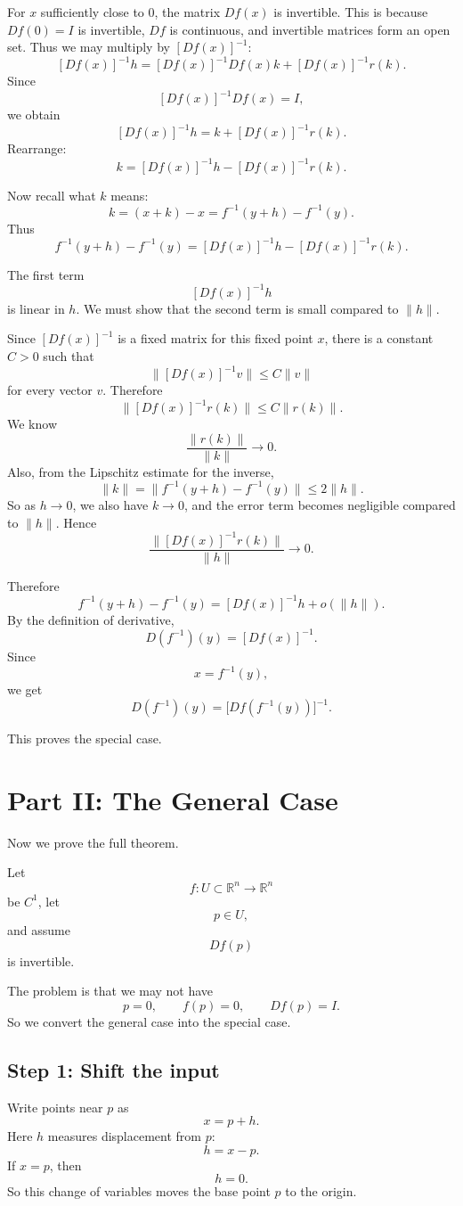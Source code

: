 \documentclass[11pt]{article}
\begin{document}
For $x$ sufficiently close to $0$, the matrix $Df(x)$ is invertible. This is because $Df(0)=I$ is invertible, $Df$ is continuous, and invertible matrices form an open set. Thus we may multiply by $[Df(x)]^{-1}$:
\[
[Df(x)]^{-1}h
=
[Df(x)]^{-1}Df(x)k+[Df(x)]^{-1}r(k).
\]
Since
\[
[Df(x)]^{-1}Df(x)=I,
\]
we obtain
\[
[Df(x)]^{-1}h=k+[Df(x)]^{-1}r(k).
\]
Rearrange:
\[
k=[Df(x)]^{-1}h-[Df(x)]^{-1}r(k).
\]

Now recall what $k$ means:
\[
k=(x+k)-x=f^{-1}(y+h)-f^{-1}(y).
\]
Thus
\[
f^{-1}(y+h)-f^{-1}(y)
=
[Df(x)]^{-1}h-[Df(x)]^{-1}r(k).
\]

The first term
\[
[Df(x)]^{-1}h
\]
is linear in $h$. We must show that the second term is small compared to $\|h\|$.

Since $[Df(x)]^{-1}$ is a fixed matrix for this fixed point $x$, there is a constant $C>0$ such that
\[
\|[Df(x)]^{-1}v\|\le C\|v\|
\]
for every vector $v$. Therefore
\[
\|[Df(x)]^{-1}r(k)\|
\le C\|r(k)\|.
\]
We know
\[
\frac{\|r(k)\|}{\|k\|}\to 0.
\]
Also, from the Lipschitz estimate for the inverse,
\[
\|k\|=\|f^{-1}(y+h)-f^{-1}(y)\|
\le 2\|h\|.
\]
So as $h\to 0$, we also have $k\to 0$, and the error term becomes negligible compared to $\|h\|$. Hence
\[
\frac{\|[Df(x)]^{-1}r(k)\|}{\|h\|}\to 0.
\]

Therefore
\[
f^{-1}(y+h)-f^{-1}(y)
=
[Df(x)]^{-1}h+o(\|h\|).
\]
By the definition of derivative,
\[
D(f^{-1})(y)=[Df(x)]^{-1}.
\]
Since
\[
x=f^{-1}(y),
\]
we get
\[
D(f^{-1})(y)=\bigl[Df(f^{-1}(y))\bigr]^{-1}.
\]

This proves the special case.

\section*{Part II: The General Case}

Now we prove the full theorem.

Let
\[
f:U\subset \mathbb R^n\to \mathbb R^n
\]
be $C^1$, let
\[
p\in U,
\]
and assume
\[
Df(p)
\]
is invertible.

The problem is that we may not have
\[
p=0,
\qquad
f(p)=0,
\qquad
Df(p)=I.
\]
So we convert the general case into the special case.

\subsection*{Step 1: Shift the input}

Write points near $p$ as
\[
x=p+h.
\]
Here $h$ measures displacement from $p$:
\[
h=x-p.
\]
If $x=p$, then
\[
h=0.
\]
So this change of variables moves the base point $p$ to the origin.
\end{document}
